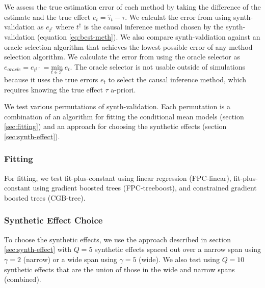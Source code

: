 We assess the true estimation error of each method by taking the difference of the estimate and the true effect $e_t = \hat{\tau}_t - \tau$. We calculat the error from using synth-validation as $e_{t^\dagger}$ where $t^\dagger$ is the causal inference method chosen by the synth-validation (equation \ref{eq:best-meth}). We also compare synth-valdiation against an oracle selection algorithm that achieves the lowest possible error of any method selection algorithm. We calculate the error from using the oracle selector as $e_{oracle} = e_{t^{\dagger \dagger}} = \underset{t \in \mathcal{T}}{\text{min}} \ e_t$. The oracle selector is not usable outside of simulations because it uses the true errors $e_t$ to select the causal inference method, which requires knowing the true effect $\tau$ a-priori.

We test various permutations of synth-validation. Each permutation is a combination of an algorithm for fitting the conditional mean models (section \ref{sec:fitting}) and an approach for choosing the synthetic effects (section \ref{sec:synth-effect}).

\subsubsection{Fitting}
\label{sec:fitting-eval}
For fitting, we test fit-plus-constant using linear regression (FPC-linear), fit-plus-constant using gradient boosted trees (FPC-treeboost), and constrained gradient boosted trees (CGB-tree).

\subsubsection{Synthetic Effect Choice}
\label{sec:synth-effect-eval}
To choose the synthetic effects, we use the approach described in section \ref{sec:synth-effect} with $Q=5$ synthetic effects spaced out over a narrow span using $\gamma=2$ (narrow) or a wide span using $\gamma=5$ (wide). We also test using $Q=10$ synthetic effects that are the union of those in the wide and narrow spans (combined). 


